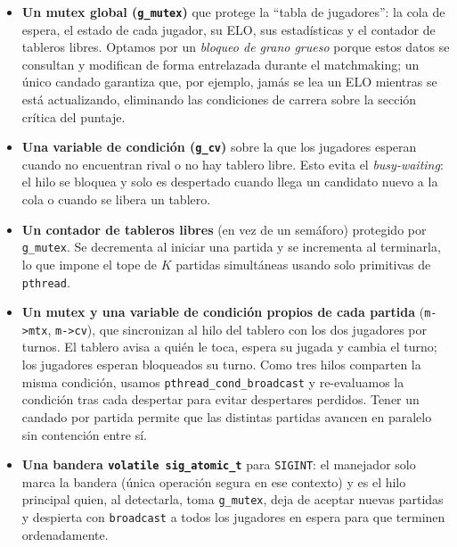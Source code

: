 \documentclass[11pt]{article}
\begin{document}
\begin{itemize}[leftmargin=1.4em, itemsep=0.2em]
  \item \textbf{Un mutex global (\texttt{g\_mutex})} que protege la ``tabla de
  jugadores'': la cola de espera, el estado de cada jugador, su ELO, sus
  estadísticas y el contador de tableros libres. Optamos por un \emph{bloqueo
  de grano grueso} porque estos datos se consultan y modifican de forma
  entrelazada durante el matchmaking; un único candado garantiza que, por
  ejemplo, jamás se lea un ELO mientras se está actualizando, eliminando las
  condiciones de carrera sobre la sección crítica del puntaje.

  \item \textbf{Una variable de condición (\texttt{g\_cv})} sobre la que los
  jugadores esperan cuando no encuentran rival o no hay tablero libre. Esto evita
  el \emph{busy-waiting}: el hilo se bloquea y solo es despertado cuando llega un
  candidato nuevo a la cola o cuando se libera un tablero.

  \item \textbf{Un contador de tableros libres} (en vez de un semáforo) protegido
  por \texttt{g\_mutex}. Se decrementa al iniciar una partida y se incrementa al
  terminarla, lo que impone el tope de $K$ partidas simultáneas usando solo
  primitivas de \texttt{pthread}.

  \item \textbf{Un mutex y una variable de condición propios de cada partida}
  (\texttt{m->mtx}, \texttt{m->cv}), que sincronizan al hilo del tablero con los
  dos jugadores por turnos. El tablero avisa a quién le toca, espera su jugada y
  cambia el turno; los jugadores esperan bloqueados su turno. Como tres hilos
  comparten la misma condición, usamos \texttt{pthread\_cond\_broadcast} y
  re-evaluamos la condición tras cada despertar para evitar despertares perdidos.
  Tener un candado por partida permite que las distintas partidas avancen en
  paralelo sin contención entre sí.

  \item \textbf{Una bandera \texttt{volatile sig\_atomic\_t}} para \texttt{SIGINT}:
  el manejador solo marca la bandera (única operación segura en ese contexto) y
  es el hilo principal quien, al detectarla, toma \texttt{g\_mutex}, deja de
  aceptar nuevas partidas y despierta con \texttt{broadcast} a todos los
  jugadores en espera para que terminen ordenadamente.
\end{itemize}

\end{document}
